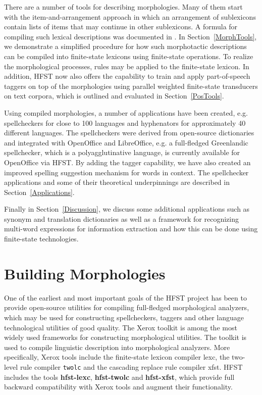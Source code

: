 \documentclass{llncs}
\begin{document}
There are a number of tools for describing morphologies. Many of them 
start with the item-and-arrangement approach in which an arrangement of 
sublexicons contain lists of items that may continue in other sublexicons. A formula
for compiling such lexical descriptions was documented in \cite{linden/2009/sfcm}.
In Section~\ref{MorphTools}, we demonstrate a simplified procedure 
for how such morphotactic descriptions 
can be compiled into finite-state lexicons using finite-state operations. 
To realize the morphological processes, rules may be applied to the finite-state lexicon. 
In addition, HFST now also offers the capability to train and apply part-of-speech
taggers on top of the morphologies using parallel weighted finite-state transducers on 
text corpora, which is outlined and evaluated in Section~\ref{PosTools}.

Using compiled morphologies, a number of applications
have been created, e.g. spellcheckers for close to 100 languages and
hyphenators for approximately 40 different languages. The spellcheckers were
derived from open-source dictionaries and integrated with OpenOffice and
LibreOffice, e.g. a full-fledged Greenlandic spellchecker, which is a
polyagglutinative language, is currently available for OpenOffice via HFST. 
By adding the tagger capability, we have also created an
improved spelling suggestion mechanism for words in context.
The spellchecker applications and some of their theoretical underpinnings are described 
in Section~\ref{Applications}.

Finally  in Section~\ref{Discussion}, we discuss some additional applications such as 
synonym and translation dictionaries as well as a framework for recognizing 
multi-word expressions for information extraction and how this can be done 
using finite-state technologies.

\section{Building Morphologies}\label{LexiconTools}



One of the earliest and most important goals of the HFST project has
been to provide open-source utilities for compiling full-fledged
morphological analyzers, which may be used for constructing spellcheckers,
taggers and other language technological utilities of good
quality. The Xerox toolkit \cite{beesley/2003} is among the most
widely used frameworks for constructing morphological utilities. The
toolkit is used to compile linguistic description into morphological
analyzers. More specifically, Xerox tools include the finite-state
lexicon compiler lexc, the two-level rule compiler \verb|twolc| and the
cascading replace rule compiler xfst. HFST includes the tools
\textbf{hfst-lexc}, \textbf{hfst-twolc} and \textbf{hfst-xfst}, which provide full backward
compatibility with Xerox tools and augment their functionality.
\end{document}

